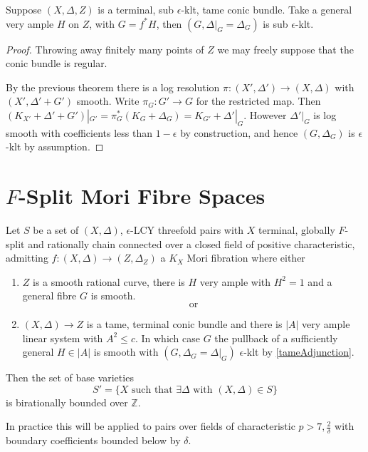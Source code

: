 \documentclass[a4paper,12pt]{book}
\begin{document}
\begin{corollary}\label{tameAdjunction}
	Suppose $(X,\Delta,Z)$ is a terminal, sub $\epsilon$-klt, tame conic bundle. Take a general very ample $H$ on $Z$, with $G=f^{*}H$, then
	 $(G,\Delta|_{G}=\Delta_{G})$ is sub $\epsilon$-klt.
\end{corollary}
\begin{proof}
	Throwing away finitely many points of $Z$ we may freely suppose that the conic bundle is regular.
	
	By the previous theorem there is a log resolution $\pi\colon (X',\Delta') \to (X,\Delta)$ with $(X',\Delta'+G')$ smooth. Write $\pi_{G}\colon G' \to G$ for the restricted map. Then $(K_{X'}+\Delta'+G')|_{G'}=\pi_{G}^{*}(K_{G}+\Delta_{G})=K_{G'}+\Delta'|_{G}$. However $\Delta'|_{G}$ is log smooth with coefficients less than $1-\epsilon$ by construction, and hence $(G,\Delta_{G})$ is $\epsilon$-klt by assumption. 
\end{proof}


	
\section{$F$-Split Mori Fibre Spaces}

\begin{theorem}\label{setup}
	Let $S$ be a set of $(X,\Delta)$, $\epsilon$-LCY threefold pairs with $X$ terminal, globally $F$-split and rationally chain connected over a closed field of positive characteristic, admitting $f\colon (X,\Delta) \to (Z,\Delta_{Z})$ a $K_{X}$ Mori fibration where either
	\begin{enumerate}
		\item $Z$ is a smooth rational curve, there is $H$ very ample with $H^{2}=1$ and a general fibre $G$ is smooth.\\
		\[\text{or}\]
		\item $(X,\Delta) \to Z$ is a tame, terminal conic bundle and there is $|A|$ very ample linear system with $A^{2} \leq c$. In which case $G$ the pullback of a sufficiently general $H \in |A|$ is smooth with $(G,\Delta_{G}=\Delta|_{G})$ $\epsilon$-klt by \autoref{tameAdjunction}.
	\end{enumerate}
	Then the set of base varieties $$S'=\{X \text{ such that } \exists \Delta \text{ with } (X,\Delta) \in S\}$$ is birationally bounded over $\mathbb{Z}$. 
\end{theorem}

\begin{remark}
	In practice this will be applied to pairs over fields of characteristic $p > 7,\frac{2}{\delta}$ with boundary coefficients bounded below by $\delta$.
\end{remark}
\end{document}
